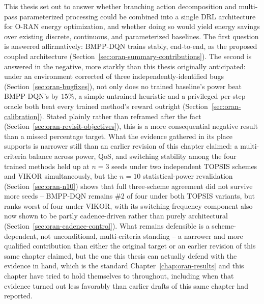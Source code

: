 This thesis set out to answer whether branching action decomposition and
multi-pass parameterized processing could be combined into a single DRL
architecture for O-RAN energy optimization, and whether doing so would
yield energy savings over existing discrete, continuous, and parameterized
baselines. The first question is answered affirmatively: BMPP-DQN trains
stably, end-to-end, as the proposed coupled architecture
(Section~\ref{sec:oran-summary-contributions}). The second is answered in
the negative, more starkly than this thesis originally anticipated: under
an environment corrected of three independently-identified bugs
(Section~\ref{sec:oran-bugfixes}), not only does no trained baseline's
power beat BMPP-DQN's by $15\%$, a simple untrained heuristic and a
privileged per-step oracle both beat every trained method's reward
outright (Section~\ref{sec:oran-calibration}). Stated plainly rather than
reframed after the fact (Section~\ref{sec:oran-revisit-objectives}), this
is a more consequential negative result than a missed percentage target.
What the evidence gathered in its place supports is narrower still than
an earlier revision of this chapter claimed: a multi-criteria balance
across power, QoS, and switching stability among the four trained methods
held up at $n=3$ seeds under two independent TOPSIS schemes and VIKOR
simultaneously, but the $n=10$ statistical-power revalidation
(Section~\ref{sec:oran-n10}) shows that full three-scheme agreement did
not survive more seeds -- BMPP-DQN remains \#2 of four under both TOPSIS
variants, but ranks worst of four under VIKOR, with its
switching-frequency component also now shown to be partly cadence-driven
rather than purely architectural (Section~\ref{sec:oran-cadence-control}).
What remains defensible is a scheme-dependent, not unconditional,
multi-criteria standing -- a narrower and more qualified contribution
than either the original target or an earlier revision of this same
chapter claimed, but the one this thesis can actually defend with the
evidence in hand, which is the standard Chapter~\ref{chap:oran-results}
and this chapter have tried to hold themselves to throughout, including
when that evidence turned out less favorably than earlier drafts of this
same chapter had reported.

